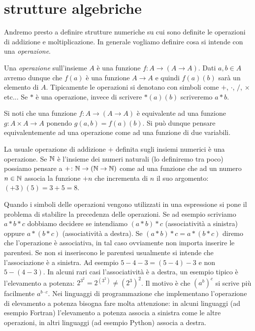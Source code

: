 \section{strutture algebriche}

Andremo presto a definire strutture numeriche su cui sono definite le operazioni 
di addizione e moltiplicazione. 
In generale vogliamo definire cosa si intende con una \emph{operazione}.
%
%

Una \emph{operazione} sull'insieme $A$ è una funzione 
$f\colon A\to(A\to A)$.
Dati $a,b\in A$ avremo dunque che $f(a)$ è una funzione $A\to A$
e quindi $f(a)(b)$ sarà un elemento di $A$. 
Tipicamente le operazioni si denotano con simboli come $+$, $\cdot$, $/$, $\times$ etc...
Se $*$ è una operazione, invece di scrivere $*(a)(b)$ scriveremo 
$a*b$.

Si noti che una funzione $f\colon A\to (A\to A)$ è equivalente ad una funzione
$g\colon A\times A \to A$ ponendo $g(a,b) = f(a)(b)$. 
Si può dunque pensare equivalentemente ad una operazione 
come ad una funzione di due variabili.

\begin{example}
La usuale operazione di addizione $+$ definita sugli insiemi numerici è una operazione.
Se ${\mathbb N}$ è l'insieme dei numeri naturali (lo definiremo tra poco)
possiamo pensare a $+\colon {\mathbb N}\to ({\mathbb N}\to {\mathbb N})$ come ad una funzione che ad un 
numero $n\in {\mathbb N}$ associa la funzione $+n$ che incrementa di $n$ il suo argomento:
$(+3)(5)=3+5=8$.
\end{example}

Quando i simboli delle operazioni vengono utilizzati in una espressione si pone 
il problema di stabilire la precedenza delle operazioni.
Se ad esempio scriviamo $a*b*c$ dobbiamo decidere se intendiamo
$(a*b)*c$ (associatività a sinistra) oppure $a*(b*c)$ (associatività a destra).
Se $(a*b)*c=a*(b*c)$ diremo che l'operazione è associativa, in tal 
caso ovviamente non importa inserire le parentesi.
Se non si inseriscono le parentesi usualmente si intende che l'associazione è a sinistra.
Ad esempio $5-4-3 = (5-4)-3$ e non $5-(4-3)$. 
In alcuni rari casi l'associatività è a destra, un esempio tipico è l'elevamento 
a potenza: $2^{3^2} = 2^{(3^2)} \neq (2^3)^2$.
Il motivo è che $(a^b)^c$ si scrive più facilmente $a^{b\cdot c}$.
Nei linguaggi di programmazione che implementano l'operazione di elevamento 
a potenza bisogna fare molta attenzione: in alcuni linguaggi (ad esempio Fortran) 
l'elevamento a potenza 
associa a sinistra come le altre operazioni, in altri linguaggi (ad esempio Python)
associa a destra.

